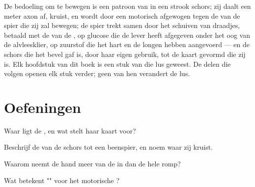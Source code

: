 \begin{remark}\label{rem:g12:brain-and-movement:loop}
De bedoeling om te bewegen is een patroon van  in een
strook schors; zij daalt een meter axon af, kruist, en wordt door een
motorisch  afgewogen tegen de  van de spier die zij zal
bewegen; de spier trekt samen door het schuiven van draadjes, betaald met
de  van de , op glucose die de lever heeft afgegeven onder
het oog van de alvleesklier, op zuurstof die het hart en de longen hebben
aangevoerd --- en de schors die het bevel gaf is, door haar eigen gebruik,
tot de kaart gevormd die zij is. Elk hoofdstuk van dit boek is een stuk
van die lus geweest. De delen die volgen openen elk stuk verder; geen van
hen verandert de lus.
\end{remark}

\section{Oefeningen}

\begin{exercise}[$\star$]\label{exo:g12:brain-and-movement:1}
Waar ligt de , en wat stelt haar kaart voor?
\end{exercise}

\begin{exercise}[$\star$]\label{exo:g12:brain-and-movement:2}
Beschrijf de  van de schors tot een beenspier, en noem
waar zij kruist.
\end{exercise}

\begin{exercise}[$\star$]\label{exo:g12:brain-and-movement:3}
Waarom neemt de hand meer van de  in dan de hele romp?
\end{exercise}

\begin{exercise}[$\star$]\label{exo:g12:brain-and-movement:4}
Wat betekent "" voor het motorische ?
\end{exercise}

